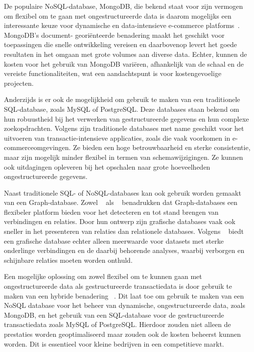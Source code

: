 De populaire NoSQL-database, MongoDB, die bekend staat voor zijn vermogen om flexibel om te
gaan met ongestructureerde data is daarom mogelijks een interessante keuze voor dynamische en
data-intensieve e-commerce platforms~\autocite{Inetum2022}. MongoDB's document-
georiënteerde benadering maakt het geschikt voor toepassingen die snelle ontwikkeling vereisen en
daarbovenop levert het goede resultaten in het omgaan met grote volumes aan diverse data. Echter,
kunnen de kosten voor het gebruik van MongoDB variëren, afhankelijk van de schaal en de vereiste
functionaliteiten, wat een aandachtspunt is voor kostengevoelige projecten.

Anderzijds is er ook de mogelijkheid om gebruik te maken van een traditionele SQL-database, zoals
MySQL of PostgreSQL. Deze databases staan bekend om hun robuustheid bij het verwerken van
gestructureerde gegevens en hun complexe zoekopdrachten. Volgens \textcite{Solarwinds} zijn traditionele databases met name geschikt voor het uitvoeren van transactie-intensieve applicaties,
zoals die vaak voorkomen in e-commerceomgevingen. Ze bieden een hoge betrouwbaarheid en sterke consistentie, maar zijn mogelijk minder flexibel in termen van schemawijzigingen. Ze kunnen ook uitdagingen opleveren bij het opschalen naar grote hoeveelheden ongestructureerde gegevens.

Naast traditionele SQL- of NoSQL-databases kan ook gebruik worden gemaakt van een Graph-database. Zowel ~\textcite{AWS} als ~\textcite{Foote2023} benadrukken dat Graph-databases een flexibeler platform bieden voor het detecteren en tot stand brengen van verbindingen en relaties. Door hun ontwerp zijn grafische databases vaak ook sneller in het presenteren van relaties dan relationele databases. Volgens ~\textcite{AWS} biedt een grafische database echter alleen meerwaarde voor datasets met sterke onderlinge verbindingen en de daarbij behorende analyses, waarbij verborgen en schijnbare relaties moeten worden onthuld.

Een mogelijke oplossing om zowel flexibel om te kunnen gaan met ongestructureerde data als
gestructureerde transactiedata is door gebruik te maken van een hybride benadering ~\autocite{DevX2023}. Dit laat toe om
gebruik te maken van een NoSQL database voor het beheer van dynamische, ongestructureerde
data, zoals MongoDB, en het gebruik van een SQL-database voor de gestructureerde transactiedata
zoals MySQL of PostgreSQL. Hierdoor zouden niet alleen de prestaties worden geoptimaliseerd maar
zouden ook de kosten beheerst kunnen worden. Dit is essentieel voor kleine bedrijven in een
competitieve markt.

